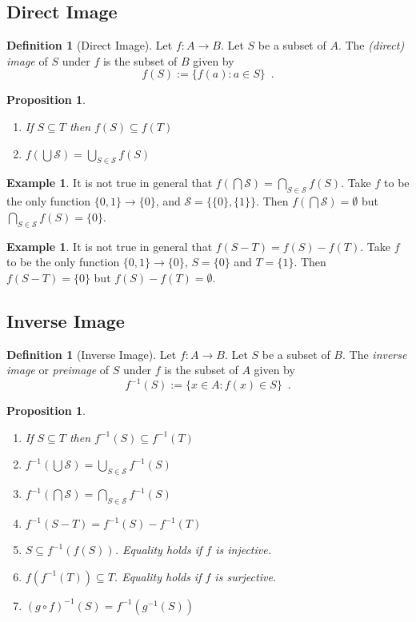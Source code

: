 \documentclass{book}
\newtheorem{prop}[ax]{Proposition}
\theoremstyle{definition}
\newtheorem{df}[ax]{Definition}
\newtheorem{ex}[ax]{Example}
\newcommand{\inv}[1]{\ensuremath{{#1}^{-1}}}
\begin{document}
\subsection{Direct Image} %

\begin{df}[Direct Image]
Let $f : A \rightarrow B$. Let $S$ be a subset of $A$. The \emph{(direct) image} of $S$ under $f$ is the subset of $B$ given by
\[ f(S) := \{ f(a) : a \in S \} \enspace . \]
\end{df}

\begin{prop}
$ $
\begin{enumerate}
\item If $S \subseteq T$ then $f(S) \subseteq f(T)$
\item $f(\bigcup \mathcal{S}) = \bigcup_{S \in \mathcal{S}} f(S)$
\end{enumerate}
\end{prop}

\begin{ex}
It is not true in general that $f(\bigcap \mathcal{S}) = \bigcap_{S \in \mathcal{S}} f(S)$. Take $f$ to be the only function $\{0,1\} \rightarrow \{0\}$, and $\mathcal{S} = \{\{0\},\{1\}\}$. Then $f(\bigcap \mathcal{S}) = \emptyset$ but $\bigcap_{S \in \mathcal{S}} f(S) = \{0\}$.
\end{ex}

\begin{ex}
It is not true in general that $f(S - T) = f(S) - f(T)$. Take $f$ to be the only function $\{0,1\} \rightarrow \{0\}$, $S = \{0\}$ and $T = \{1\}$. Then $f(S-T) = \{0\}$ but $f(S) - f(T) = \emptyset$.
\end{ex}

\subsection{Inverse Image} %

\begin{df}[Inverse Image]
Let $f : A \rightarrow B$. Let $S$ be a subset of $B$. The \emph{inverse image} or \emph{preimage} of $S$ under $f$ is the subset of $A$ given by
\[ \inv{f}(S) := \{ x \in A : f(x) \in S \} \enspace . \]
\end{df}

\begin{prop}
\begin{enumerate}
\item If $S \subseteq T$ then $\inv{f}(S) \subseteq \inv{f}(T)$
\item $\inv{f}(\bigcup \mathcal{S}) = \bigcup_{S \in \mathcal{S}} \inv{f}(S)$
\item $\inv{f}(\bigcap \mathcal{S}) = \bigcap_{S \in \mathcal{S}} \inv{f}(S)$
\item $\inv{f}(S - T) = \inv{f}(S) - \inv{f}(T)$
\item $S \subseteq \inv{f}(f(S))$. Equality holds if $f$ is injective.
\item $f(\inv{f}(T)) \subseteq T$. Equality holds if $f$ is surjective.
\item $\inv{(g \circ f)}(S) = \inv{f}(\inv{g}(S))$
\end{enumerate}
\end{prop}
\end{document}
